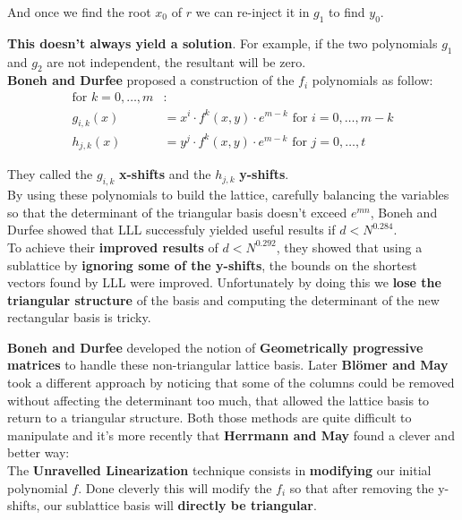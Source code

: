 \documentclass[a4paper,11pt]{article}
\begin{document}
And once we find the root $x_0$ of $r$ we can re-inject it in $g_1$ to find $y_0$.

\textbf{This doesn't always yield a solution}. For example, if the two polynomials $g_1$ and $g_2$ are not independent, the resultant will be zero.\\

\textbf{Boneh and Durfee} proposed a construction of the $f_i$ polynomials as follow:
\begin{align*}
	\text{for } k = 0,\hdots,m&:\\
	g_{i,k}(x) &= x^i \cdot f^k(x,y) \cdot e^{m-k} \text{ for } i=0,\hdots,m-k\\
	h_{j,k}(x) &= y^j \cdot f^k(x,y) \cdot e^{m-k} \text{ for } j = 0,\hdots,t
\end{align*}

They called the $g_{i,k}$ \textbf{x-shifts} and the $h_{j,k}$ \textbf{y-shifts}.\\

By using these polynomials to build the lattice, carefully balancing the variables so that the determinant of the triangular basis doesn't exceed $e^{mn}$, Boneh and Durfee showed that LLL successfuly yielded useful results if $d < N^{0.284}$.\\

To achieve their \textbf{improved results} of $d < N^{0.292}$, they showed that using a sublattice by \textbf{ignoring some of the y-shifts}, the bounds on the shortest vectors found by LLL were improved. Unfortunately by doing this we \textbf{lose the triangular structure} of the basis and computing the determinant of the new rectangular basis is tricky.

\textbf{Boneh and Durfee} developed the notion of \textbf{Geometrically progressive matrices} to handle these non-triangular lattice basis. Later \textbf{Blömer and May} took a different approach by noticing that some of the columns could be removed without affecting the determinant too much, that allowed the lattice basis to return to a triangular structure. Both those methods are quite difficult to manipulate and it's more recently that \textbf{Herrmann and May} found a clever and better way:\\

The \textbf{Unravelled Linearization} technique consists in \textbf{modifying} our initial polynomial $f$. Done cleverly this will modify the $f_i$ so that after removing the y-shifts, our sublattice basis will \textbf{directly be triangular}.
\end{document}

